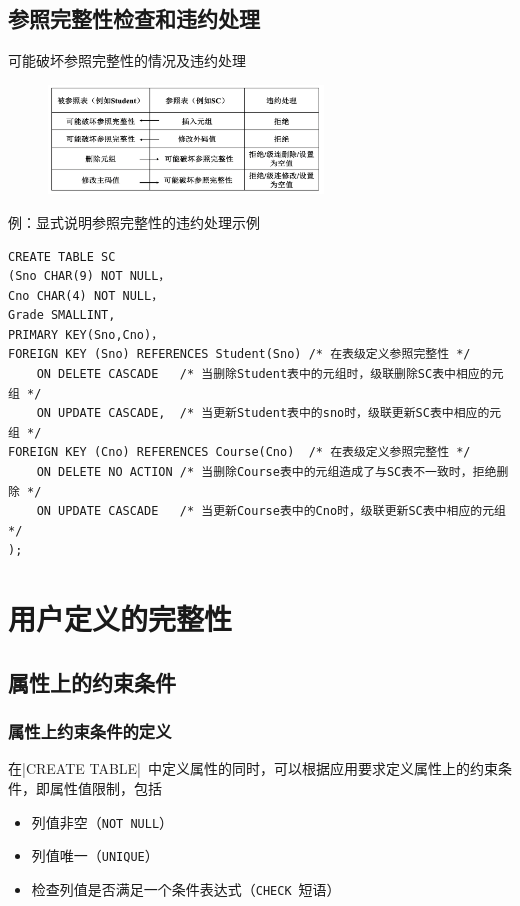 \subsection{参照完整性检查和违约处理}
可能破坏参照完整性的情况及违约处理
\begin{figure}[H]
    \vspace{-0.5em}
	\centering
	\includegraphics[width=0.65\textwidth]{images/5.2.2}
    \vspace{-1em}
\end{figure}

例：显式说明参照完整性的违约处理示例
\begin{lstlisting}
CREATE TABLE SC
(Sno CHAR(9) NOT NULL，
Cno CHAR(4) NOT NULL，
Grade SMALLINT,
PRIMARY KEY(Sno,Cno)， 			
FOREIGN KEY (Sno) REFERENCES Student(Sno) /* 在表级定义参照完整性 */
	ON DELETE CASCADE   /* 当删除Student表中的元组时，级联删除SC表中相应的元组 */
	ON UPDATE CASCADE,  /* 当更新Student表中的sno时，级联更新SC表中相应的元组 */
FOREIGN KEY (Cno) REFERENCES Course(Cno)  /* 在表级定义参照完整性 */                    
	ON DELETE NO ACTION /* 当删除Course表中的元组造成了与SC表不一致时，拒绝删除 */
	ON UPDATE CASCADE   /* 当更新Course表中的Cno时，级联更新SC表中相应的元组 */
);
\end{lstlisting}

\section{用户定义的完整性}

\subsection{属性上的约束条件}

\subsubsection{属性上约束条件的定义}
在\sverb|CREATE TABLE|\ 中定义属性的同时，可以根据应用要求定义属性上的约束条件，即属性值限制，包括
\begin{itemize}
    \item 列值非空（\verb|NOT NULL|）
    \item 列值唯一（\verb|UNIQUE|）
    \item 检查列值是否满足一个条件表达式（\verb|CHECK|\ 短语）
\end{itemize}

